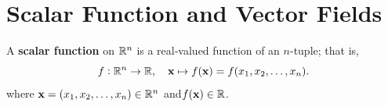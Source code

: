 \documentclass[11pt,openany]{article}
\renewcommand{\vec}[1]{\mathbf{#1}}
\begin{document}
\section*{Scalar Function and Vector Fields}
A \textbf{scalar function} on \(\mathbb{R}^n\) is a real‑valued function of an \(n\)-tuple; that is,
\[
f:\R^n\to\R,\quad\vec{x}\mapsto f(\vec{x})=f(x_1,x_2,\dots,x_n).
\] where \(\vec{x}=(x_1,x_2,\dots,x_n)\in\R^n\) and\(f(\vec{x})\in\R\).
%
%
%
%
%
%
%
%
%
%
%	
%	
%	
\end{document}
